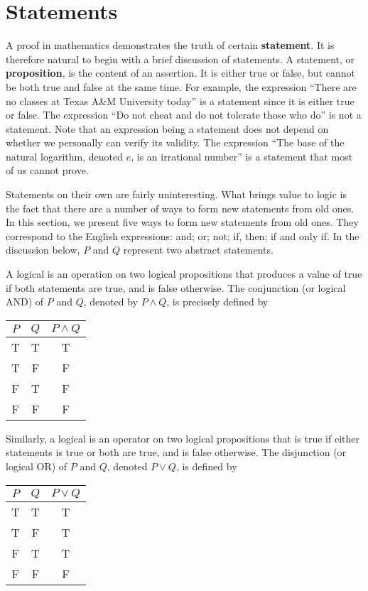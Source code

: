 \section{Statements}

A proof in mathematics demonstrates the truth of certain \textbf{statement}.
It is therefore natural to begin with a brief discussion of statements.
A statement, or \textbf{proposition}, is the content of an assertion.
It is either true or false, but cannot be both true and false at the same time.
For example, the expression ``There are no classes at Texas A\&M University today'' is a statement since it is either true or false.
The expression ``Do not cheat and do not tolerate those who do'' is not a statement.
Note that an expression being a statement does not depend on whether we personally can verify its validity.
The expression ``The base of the natural logarithm, denoted $e$, is an irrational number'' is a statement that most of us cannot prove.

Statements on their own are fairly uninteresting.
What brings value to logic is the fact that there are a number of ways to form new statements from old ones.
In this section, we present five ways to form new statements from old ones.
They correspond to the English expressions: and; or; not; if, then; if and only if.
In the discussion below, $P$ and $Q$ represent two abstract statements.

A logical  is an operation on two logical propositions that produces a value of true if both statements are true, and is false otherwise.
The conjunction (or logical AND) of $P$ and $Q$, denoted by $P \wedge Q$, is precisely defined by
\begin{center}
\begin{tabular}{|c|c|c|}
\hline
$P$ & $Q$ & $P \wedge Q$ \\
\hline
T & T & T \\
T & F & F \\
F & T & F \\
F & F & F \\
\hline
\end{tabular}
\end{center}

Similarly, a logical  is an operator on two logical propositions that is true if either statements is true or both are true, and is false otherwise.
The disjunction (or logical OR) of $P$ and $Q$, denoted $P \vee Q$, is defined by
\begin{center}
\begin{tabular}{|c|c|c|}
\hline
$P$ & $Q$ & $P \vee Q$ \\
\hline
T & T & T \\
T & F & T \\
F & T & T \\
F & F & F \\
\hline
\end{tabular}
\end{center}

